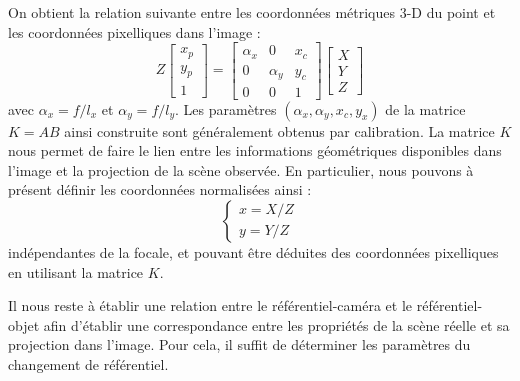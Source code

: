 On obtient la relation suivante entre les coordonnées métriques 3-D du point et les coordonnées pixelliques dans l'image :
\begin{equation}
Z\begin{bmatrix}
x_p \\y_p \\ 1
\end{bmatrix}
=
\begin{bmatrix}
\alpha_x & 0 & x_c \\ 0 & \alpha_y & y_c \\ 0 & 0 & 1 
\end{bmatrix}
\begin{bmatrix}
X \\ Y \\ Z
\end{bmatrix}
\label{intro:eq16}
\end{equation}
avec $\alpha_x = f/l_x$ et $\alpha_y = f/l_y$. Les paramètres $(\alpha_x, \alpha_y, x_c, y_x)$ de la matrice $K = AB$ ainsi construite sont généralement obtenus par calibration. La matrice $K$ nous permet de faire le lien entre les informations géométriques disponibles dans l'image et la projection de la scène observée. En particulier, nous pouvons à présent définir les coordonnées normalisées ainsi :
\begin{equation}
\left \lbrace
\begin{matrix}
x = X/Z \\
y = Y/Z
\end{matrix} \right .
\label{intro:eq17}
\end{equation}
indépendantes de la focale, et pouvant être déduites des coordonnées pixelliques en utilisant la matrice $K$.

Il nous reste à établir une relation entre le référentiel-caméra et le référentiel-objet afin d'établir une correspondance entre les propriétés de la scène réelle et sa projection dans l'image. Pour cela, il suffit de déterminer les paramètres du changement de référentiel.

